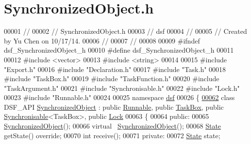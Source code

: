 \hypertarget{_synchronized_object_8h_source}{}\section{Synchronized\+Object.\+h}
\label{_synchronized_object_8h_source}

\begin{DoxyCode}
00001 \textcolor{comment}{//}
00002 \textcolor{comment}{//  SynchronizedObject.h}
00003 \textcolor{comment}{//  dsf}
00004 \textcolor{comment}{//}
00005 \textcolor{comment}{//  Created by Yu Chen on 10/17/14.}
00006 \textcolor{comment}{//}
00007 \textcolor{comment}{//}
00008 
00009 \textcolor{preprocessor}{#ifndef dsf\_SynchronizedObject\_h}
00010 \textcolor{preprocessor}{#define dsf\_SynchronizedObject\_h}
00011 
00012 \textcolor{preprocessor}{#include <vector>}
00013 \textcolor{preprocessor}{#include <string>}
00014 
00015 \textcolor{preprocessor}{#include "Export.h"}
00016 \textcolor{preprocessor}{#include "Declaration.h"}
00017 \textcolor{preprocessor}{#include "Task.h"}
00018 \textcolor{preprocessor}{#include "TaskBox.h"}
00019 \textcolor{preprocessor}{#include "TaskFunction.h"}
00020 \textcolor{preprocessor}{#include "TaskArgument.h"}
00021 \textcolor{preprocessor}{#include "Synchronisable.h"}
00022 \textcolor{preprocessor}{#include "Lock.h"}
00023 \textcolor{preprocessor}{#include "Runnable.h"}
00024 
00025 \textcolor{keyword}{namespace }\hyperlink{namespacedsf}{dsf}
00026 \{
\hypertarget{_synchronized_object_8h_source_l00062}{}\hyperlink{classdsf_1_1_synchronized_object}{00062}     \textcolor{keyword}{class }DSF\_API \hyperlink{classdsf_1_1_synchronized_object}{SynchronizedObject} : \textcolor{keyword}{public} \hyperlink{classdsf_1_1_runnable}{Runnable}, \textcolor{keyword}{public} 
      \hyperlink{classdsf_1_1_task_box}{TaskBox}, \textcolor{keyword}{public} \hyperlink{classdsf_1_1_synchronisable}{Synchronisable}<TaskBox>, \textcolor{keyword}{public} \hyperlink{classdsf_1_1_lock}{Lock}
00063     \{
00064     \textcolor{keyword}{public}:
00065         \hyperlink{namespacedsf_acbf1798fc56cfb1707162a17e13f5fda}{SynchronizedObject}();
00066         \textcolor{keyword}{virtual} ~\hyperlink{classdsf_1_1_synchronized_object}{SynchronizedObject}();
00068         \hyperlink{classdsf_1_1_runnable_a8eb63b21a0accc7a6a2a05f18e257991}{State} getState() \textcolor{keyword}{override};
00070         \textcolor{keywordtype}{int} receive();
00071     \textcolor{keyword}{private}:
00072         \hyperlink{classdsf_1_1_runnable_a8eb63b21a0accc7a6a2a05f18e257991}{State} state;

\end{DoxyCode}
